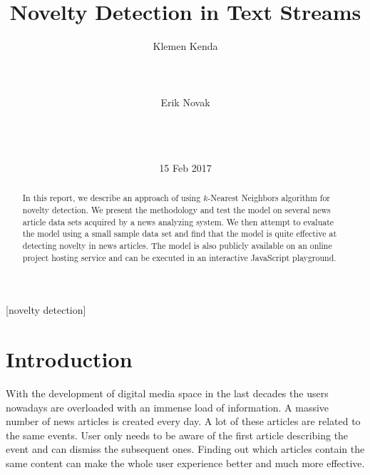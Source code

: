 \documentclass{acm_proc_article-sp}
\begin{document}
\title{Novelty Detection in Text Streams}


\author{
\alignauthor
Klemen Kenda \\
       \\
       \\
       \\
\alignauthor
Erik Novak \\
       \\
       \\
       \\
}

\date{15 Feb 2017}

\maketitle
\begin{abstract}
In this report, we describe an approach of using $k$-Nearest Neighbors algorithm for novelty detection. We present the methodology and test the model on several news article data sets acquired by a news analyzing system. We then attempt to evaluate the model using a small sample data set and find that the model is quite effective at detecting novelty in news articles. The model is also publicly available on an online project hosting service and can be executed in an interactive JavaScript playground.
\end{abstract}

[novelty detection]


\section{Introduction}
With the development of digital media space in the last decades the users nowadays are overloaded with an immense load of information. A massive number of news articles is created every day. A lot of these articles are related to the same events. User only needs to be aware of the first article describing the event and can dismiss the subsequent ones. Finding out which articles contain the same content can make the whole user experience better and much more effective.
\end{document}
